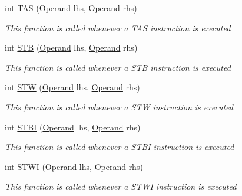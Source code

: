 \begin{DoxyCompactItemize}
int \hyperlink{class_c_p_u___o_s___simulator_1_1_c_p_u_1_1_instruction_a78fbef41ec65046f35456e7cb161d037}{T\+A\+S} (\hyperlink{class_c_p_u___o_s___simulator_1_1_c_p_u_1_1_operand}{Operand} lhs, \hyperlink{class_c_p_u___o_s___simulator_1_1_c_p_u_1_1_operand}{Operand} rhs)
\begin{DoxyCompactList}\small\item\em This function is called whenever a T\+A\+S instruction is executed \end{DoxyCompactList}\item 
int \hyperlink{class_c_p_u___o_s___simulator_1_1_c_p_u_1_1_instruction_a26aa3d1a1f62f61acc3b37c7d57743f1}{S\+T\+B} (\hyperlink{class_c_p_u___o_s___simulator_1_1_c_p_u_1_1_operand}{Operand} lhs, \hyperlink{class_c_p_u___o_s___simulator_1_1_c_p_u_1_1_operand}{Operand} rhs)
\begin{DoxyCompactList}\small\item\em This function is called whenever a S\+T\+B instruction is executed \end{DoxyCompactList}\item 
int \hyperlink{class_c_p_u___o_s___simulator_1_1_c_p_u_1_1_instruction_aa1bc7540a41bcd8ab9273cfac88a5bf8}{S\+T\+W} (\hyperlink{class_c_p_u___o_s___simulator_1_1_c_p_u_1_1_operand}{Operand} lhs, \hyperlink{class_c_p_u___o_s___simulator_1_1_c_p_u_1_1_operand}{Operand} rhs)
\begin{DoxyCompactList}\small\item\em This function is called whenever a S\+T\+W instruction is executed \end{DoxyCompactList}\item 
int \hyperlink{class_c_p_u___o_s___simulator_1_1_c_p_u_1_1_instruction_a2724896fa80e3da440271b6dba5421a3}{S\+T\+B\+I} (\hyperlink{class_c_p_u___o_s___simulator_1_1_c_p_u_1_1_operand}{Operand} lhs, \hyperlink{class_c_p_u___o_s___simulator_1_1_c_p_u_1_1_operand}{Operand} rhs)
\begin{DoxyCompactList}\small\item\em This function is called whenever a S\+T\+B\+I instruction is executed \end{DoxyCompactList}\item 
int \hyperlink{class_c_p_u___o_s___simulator_1_1_c_p_u_1_1_instruction_aec8b426958aee888d46d9cbb565ed548}{S\+T\+W\+I} (\hyperlink{class_c_p_u___o_s___simulator_1_1_c_p_u_1_1_operand}{Operand} lhs, \hyperlink{class_c_p_u___o_s___simulator_1_1_c_p_u_1_1_operand}{Operand} rhs)
\begin{DoxyCompactList}\small\item\em This function is called whenever a S\+T\+W\+I instruction is executed \end{DoxyCompactList}\item 

\end{DoxyCompactItemize}
